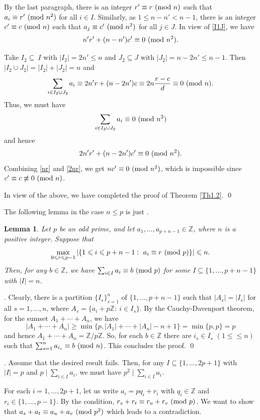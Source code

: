 \documentclass[11pt,reqno]{amsart}
\def\pmod #1{\ ({\rm{mod}}\ #1)}
\def\Z{\mathbb Z}
\def\f{\frac}
\def\ls{\leqslant}
\def\gs{\geqslant}
\def\se {\subseteq}
\def\eq{\equiv}
\def\Proof{\noindent{\it Proof}}
\theoremstyle{plain}
\newtheorem{lemma}{Lemma}
\theoremstyle{definition}
\theoremstyle{remark}
\begin{document}
By the last paragraph, there is an integer $r'\eq r\pmod n$ such that $a_i\eq r'\pmod{n^2}$
for all $i\in I$. Similarly, as $1\ls n-n'<n-1$, there is an integer $c'\eq c\pmod n$ such that $a_j\eq c'\pmod{n^2}$
for all $j\in J$. In view of \eqref{I1J}, we have
\begin{equation}
\label{nr} n'r'+(n-n')c'\eq0\pmod{n^2}.
\end{equation}

Take $I_2\se\ I$ with $|I_2|=2n'\ls n$ and $J_2\se J$ with $|J_2|=n-2n'\ls n-1$. Then
$|I_2\cup J_2|=|I_2|+|J_2|=n$ and
$$\sum_{i\in I_2\cup J_2}a_i\eq 2n'r+(n-2n')c\eq 2n\f{r-c}d\eq0\pmod n.$$
Thus, we must have
$$\sum_{i\in I_2\cup J_2}a_i\eq0\pmod{n^2}$$
and hence
\begin{equation}\label{2nr}2n'r'+(n-2n')c'\eq0\pmod{n^2}.
\end{equation}
Combining \eqref{nr} and \eqref{2nr}, we get $nc'\eq0\pmod{n^2}$,
which is impossible since $c'\eq c\not\eq0\pmod n$.

In view of the above, we have completed the proof of Theorem \ref{Th1.2}. \qed





The following lemma in the case $n\ls p$ is just \cite[Lemma 3.4]{G26}.

\begin{lemma} \label{Lem-pn} Let $p$ be an odd prime, and let $a_1,\ldots,a_{p+n-1}\in\Z$, where $n$ is a positive integer. Suppose that
$$\max_{0\ls r\ls p-1}|\{1\ls i\ls p+n-1:\ a_i\eq r\pmod p\}|\ls n.$$ Then, for any $b\in\Z$, we have
$\sum_{i\in I}a_i\eq b\pmod p$ for some $I\se\{1,\ldots,p+n-1\}$
with $|I|=n$.
\end{lemma}
\Proof. Clearly, there is a partition $\{I_s\}_{s=1}^n$ of $\{1,\ldots,p+n-1\}$
such that $|A_s|=|I_s|$ for all $s=1,\ldots,n$, where $A_s=\{a_i+p\Z:\ i\in I_s\}$.
 By the Cauchy-Davenport
theorem, for the sumset $A_1+\cdots+A_n$, we have
$$ |A_1+\cdots+A_n|\gs\min\{p,|A_1|+\cdots+|A_n|-n+1\}=\min\{p,p\}=p$$
and hence $A_1+\cdots+A_n=\Z/p\Z$. So, for each $b\in\Z$ there are $i_s\in I_s$ $(1\ls \ls n)$
such that $\sum_{s=1}^n a_{i_s}\eq b\pmod n$. This concludes the proof. \qed




\medskip
{}.
Assume that the desired result fails. Then, for any $I\se\{1,\ldots,2p+1\}$
with $|I|=p$ and $p\mid\sum_{i\in I}a_i$, we must have $p^2\mid \sum_{i\in I}a_i$.

For each $i=1,\ldots,2p+1$, let us write  $a_i=pq_i+r_i$ with $q_i\in\Z$ and $r_i\in\{1,\ldots,p-1\}$. By the condition, $r_s+r_t\eq r_u+r_v\pmod p$.
We want to show that $a_s+a_t\eq a_u+a_v\pmod {p^2}$ which leads to a contradiction.
\end{document}
